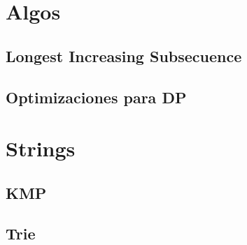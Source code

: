 \section{Algos}%
\subsection{Longest Increasing Subsecuence}
\subsection[7-]{Optimizaciones para DP}%

\section{Strings}%
\subsection{KMP}
\subsection{Trie}
